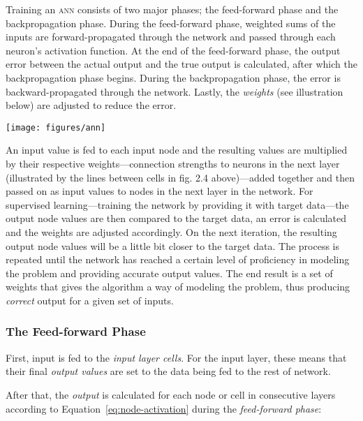 \begin{multicols}{2}
Training an \textsc{ann} consists of two major phases; the feed-forward phase
and the backpropagation phase.  During the feed-forward phase, weighted sums of
the inputs are forward-propagated through the network and passed through each
neuron's activation function.  At the end of the feed-forward phase, the output
error between the actual output and the true output is calculated, after which
the backpropagation phase begins.  During the backpropagation phase, the error
is backward-propagated through the network.  Lastly, the \textit{weights} (see
illustration below) are adjusted to reduce the error.

\begin{Figure}
  \texttt{[image: figures/ann]}
\end{Figure}

\noindent An input value is fed to each input node and the resulting values are
multiplied by their respective weights---connection strengths to neurons in the
next layer (illustrated by the lines between cells in fig. 2.4 above)---added
together and then passed on as input values to nodes in the next layer in the
network.  For supervised learning---training the network by providing it with
target data---the output node values are then compared to the target data, an
error is calculated and the weights are adjusted accordingly.  On the next
iteration, the resulting output node values will be a little bit closer to the
target data.  The process is repeated until the network has reached a certain
level of proficiency in modeling the problem and providing accurate output
values.  The end result is a set of weights that gives the algorithm a way of
modeling the problem, thus producing \textit{correct} output for a given set of
inputs.

\subsubsection{The Feed-forward Phase}

First, input is fed to the \textit{input layer cells}. For the input layer,
these means that their final \textit{output values} are set to the data being
fed to the rest of network.

After that, the \textit{output} is calculated for each node or cell in
consecutive layers according to Equation~\ref{eq:node-activation} during the
\textit{feed-forward phase}:


\end{multicols}
